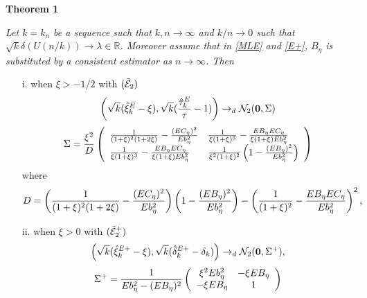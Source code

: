 \documentclass[twoside,leqno,11pt]{article}
\begin{document}
{\bf Theorem 1} {\it Let $k=k_n$ be a sequence such that $k,n \to \infty$ and $k/n \to 0$ such that $\sqrt{k}\delta (U(n/k)) \to \lambda \in \mathbb{R}$. Moreover assume that in \eqref{MLE}
and \eqref{E+}, $B_{\eta}$ is substituted by a consistent estimator as $n\to \infty$. Then
\begin{enumerate}
\item[i.] when $\xi > -1/2$ with $({\tilde{\cal{E}}}_2)$ 
$$\left( \sqrt{k}( \hat{\xi}_k^{E} -\xi), \sqrt{k} ({\hat{\tau}^{E}_k\over \tau}-1) \right)\to_d \mathcal{N}_2({\bf 0},\Sigma)$$
\[
\Sigma ={\xi^2 \over D}
\left( 
\begin{array}{ll}
{1 \over (1+\xi)^2(1+2\xi)} - \frac{ (EC_{\eta})^2}{Eb^2_{\eta}} 
 & 
{1 \over \xi(1+\xi)^3 }-\frac{EB_{\eta}EC_{\eta}}{\xi(1+\xi)Eb^2_{\eta}}
\\
{1 \over \xi(1+\xi)^3 }-\frac{EB_{\eta}EC_{\eta}}{\xi(1+\xi)Eb^2_{\eta}}
&
{1 \over \xi^2(1+\xi)^2}\left(1- \frac{(EB_{\eta})^2}{Eb^2_{\eta}} \right)
\end{array}
\right)
\]
where
\[
D=\left( {1 \over (1+\xi)^2(1+2\xi)} - \frac{ (EC_{\eta})^2}{Eb^2_{\eta}} \right)\left(1- \frac{(EB_{\eta})^2}{Eb^2_{\eta}}\right)
- \left( {1 \over (1+\xi)^2 }- \frac{EB_{\eta}EC_{\eta}}{Eb^2_{\eta}}\right)^2,
\]
\item[ii.] when $\xi>0$ with $({\tilde{\cal{E}}}_2^+)$ 
$$
\left( \sqrt{k}( \hat{\xi}_k^{E+} -\xi), \sqrt{k} (\hat{\delta}^{E+}_k - \delta_k) \right)\to_d
\mathcal{N}_2({\bf 0},\Sigma^+),
$$
 \[
\Sigma^+ ={1 \over Eb_\eta^2-(EB_\eta)^2}
\left( 
\begin{array}{cc}
\xi^2 Eb_\eta^2 
 & 
-\xi EB_\eta
\\
-\xi EB_\eta
&
1
\end{array}
\right)
\]
\end{enumerate} 
}
\end{document}
